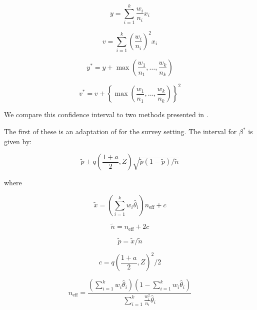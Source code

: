 \documentclass[AMA,STIX1COL]{WileyNJD-v2}
\begin{document}
\begin{equation}
    y = \sum_{i=1}^k \frac{w_i}{n_i} x_i
\end{equation}

\begin{equation}
    v = \sum_{i=1}^k \left( \frac{w_i}{n_i}\right)^2 x_i
\end{equation}

\begin{equation}
    y^* = y + \max\left(\frac{w_1}{n_1}, \ldots, \frac{w_k}{n_k} \right)
\end{equation}

\begin{equation}
    v^* = v + \left\{ \max\left(\frac{w_1}{n_1}, \ldots, \frac{w_k}{n_k} \right) \right\}^2
\end{equation}

We compare this confidence interval to two methods presented in \cite{Dean:2015}.

The first of these is an adaptation of \cite{AgrestiCoull} for the survey setting.
The interval for \( \beta^* \) is given by:

\begin{equation}
    \tilde{p} \pm q\left( \frac{1 + a}{2}, Z \right) \sqrt{\tilde{p}(1 - \tilde{p}) / \tilde{n}}
\end{equation}

where 

\begin{equation}
   \tilde{x} = \left( \sum_{i=1}^k w_i \hat{\theta}_i \right) n_{\text{eff}} + c 
\end{equation}

\begin{equation}
   \tilde{n} = n_{\text{eff}} + 2c 
\end{equation}

\begin{equation}
    \tilde{p} = \tilde{x} / \tilde{n}
\end{equation}

\begin{equation}
   c = q\left( \frac{1 + a}{2}, Z \right)^2/2 
\end{equation}

\begin{equation}
   n_{\text{eff}} = \frac{\left( \sum_{i=1}^k w_i \hat{\theta}_i \right) \left(1 - \sum_{i=1}^k w_i \hat{\theta}_i \right)}{\sum_{i=1}^k \frac{w_i^2}{n_i}\hat{\theta}_i} 
   \label{eq:neff}
\end{equation}
 
\end{document}
